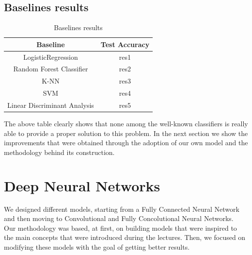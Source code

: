 \documentclass[10pt,conference,compsocconf]{IEEEtran}
\begin{document}
\subsection{Baselines results} 
\begin{table}
\caption{Baselines results}
\label{tab:baselineres}
\begin{tabular}{ | c | c | }
\hline
Baseline & Test Accuracy  \\
\hline
LogisticRegression & res1 \\
\hline
Random Forest Classifier & res2 \\
\hline
K-NN & res3 \\
\hline
SVM & res4 \\
\hline
Linear Discriminant Analysis & res5 \\
\hline
\end{tabular}
\end{table}
The above table clearly shows that none among the well-known classifiers is really able to provide a proper solution to this problem. In the next section we show the improvements that were obtained through the adoption of our own model and the methodology behind its construction. 
\section{Deep Neural Networks}
\label{sec:deep}
We designed different models, starting from a Fully Connected Neural Network and then moving to Convolutional and Fully Concolutional Neural Networks.\\
Our methodology was based, at first, on building models that were inspired to the main concepts that were introduced during the lectures. Then, we focused on modifying these models with the goal of getting better results.
\end{document}
